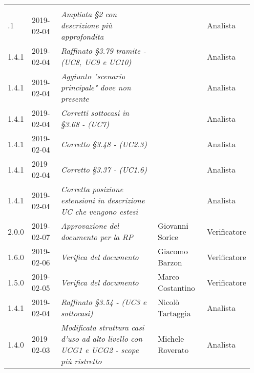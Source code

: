 \newpage 
\section*{}
	\begin{longtable}{C{2cm}|C{2.5cm}|C{4.5cm}|C{2.5cm}|C{3cm}}

	 &  &  &  &   \\
	.1 & 2019-02-04 & \emph{Ampliata §2 con descrizione più approfondita} &  & Analista \\
		\hline
	
		1.4.1 & 2019-02-04 & \emph{Raffinato §3.79 tramite - (UC8, UC9 e UC10)} &  & Analista \\
		\hline
	
		1.4.1 & 2019-02-04 & \emph{Aggiunto "scenario principale" dove non presente} &  & Analista \\
		\hline
	
		1.4.1 & 2019-02-04 & \emph{Corretti sottocasi in §3.68 - (UC7)} &  & Analista \\
		\hline
	
		1.4.1 & 2019-02-04 & \emph{Corretto §3.48 - (UC2.3)} &  & Analista \\
		\hline
		
		1.4.1 & 2019-02-04 & \emph{Corretto §3.37 - (UC1.6)} &  & Analista \\
		\hline
	
	    1.4.1 & 2019-02-04 & \emph{Corretta posizione estensioni in descrizione UC che vengono estesi} &  & Analista \\
	    \hline
	
		2.0.0 & 2019-02-07 & \emph{Approvazione del documento per la RP} & Giovanni Sorice & Verificatore \\
		\hline
	
		1.6.0 & 2019-02-06 & \emph{Verifica del documento} & Giacomo Barzon & Verificatore \\
		\hline
		
		1.5.0 & 2019-02-05 & \emph{Verifica del documento} & Marco Costantino & Verificatore \\
		\hline
	
		1.4.1 & 2019-02-04 & \emph{Raffinato §3.54 -  (UC3 e sottocasi)} & Nicolò Tartaggia & Analista \\
		\hline
	
		1.4.0 & 2019-02-03 & \emph{Modificata struttura casi d'uso ad alto livello con UCG1 e UCG2 - scope più ristretto} & Michele Roverato & Analista \\
		\hline
	

\end{longtable}
